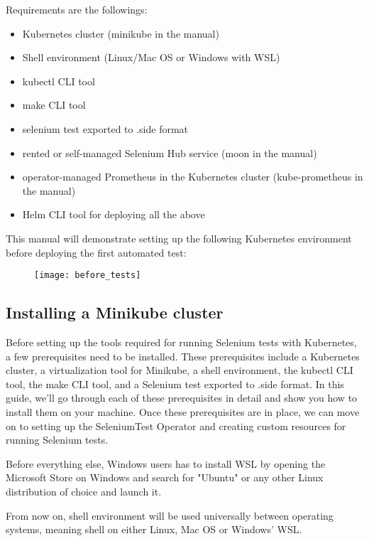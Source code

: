 Requirements are the followings:
\begin{itemize}
	\item Kubernetes cluster (minikube in the manual)
	\item Shell environment (Linux/Mac OS or Windows with WSL)
	\item kubectl CLI tool
	\item make CLI tool
	\item selenium test exported to .side format
	\item rented or self-managed Selenium Hub service (moon in the manual) 
	\item operator-managed Prometheus in the Kubernetes cluster (kube-prometheus in the manual)
	\item Helm CLI tool for deploying all the above
\end{itemize}

This manual will demonstrate setting up the following Kubernetes environment before deploying the first automated test:

\begin{figure}[H]
	\centering
	\texttt{[image: before\_tests]}
	\label{fig:before_tests}
\end{figure}

\subsection{Installing a Minikube cluster}

Before setting up the tools required for running Selenium tests with Kubernetes, a few prerequisites need to be installed. These prerequisites include a Kubernetes cluster, a virtualization tool for Minikube, a shell environment, the kubectl CLI tool, the make CLI tool, and a Selenium test exported to .side format. In this guide, we'll go through each of these prerequisites in detail and show you how to install them on your machine. Once these prerequisites are in place, we can move on to setting up the SeleniumTest Operator and creating custom resources for running Selenium tests.

Before everything else, Windows users has to install WSL by opening the Microsoft Store on Windows and search for "Ubuntu" or any other Linux distribution of choice and launch it.

From now on, shell environment will be used universally between operating systems, meaning shell on either Linux, Mac OS or Windows' WSL.

